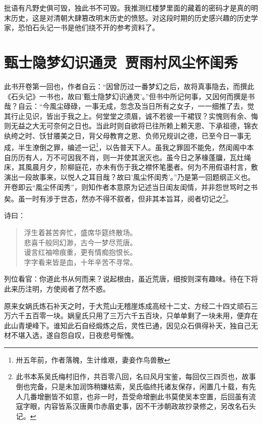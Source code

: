 \documentclass[12pt,oneside]{book}
\newenvironment{shici}{%
\begin{verse}%
\centering\large\hspace{12pt}}%
{\end{verse}}
\begin{document}
批语有凡野史俱可毁，独此书不可毁。我推测红楼梦里面的藏着的密码才是真的明末历史，这是对清朝大肆篡改明末历史的愤怒。对这段时期的历史感兴趣的历史学家，恐怕石头记一书是他们绕不开的参考资料了。



\setcounter{tocdepth}{2}    
\tableofcontents



\mainmatter


\chapter{甄士隐梦幻识通灵~贾雨村风尘怀闺秀}
此书开卷第一回也，作者自云：“因曾历过一番梦幻之后，故将真事隐去，而撰此《石头记》一书也，故曰’甄士隐梦幻识通灵’。”但书中所记何事，又因何而撰是书哉？自云：“今風尘碌碌，一事无成，忽念及当日所有之女子，一一细推了去，觉其行止见识，皆出于我之上。何堂堂之须眉，诚不若彼一干裙钗？实愧则有余、悔则无益之大无可奈何之日也。当此时则自欲将已往所赖上赖天恩、下承祖德，锦衣纨绔之时、饫甘餍美之日，背父母教育之恩、负师兄规训之德，已至今日一事无成，半生潦倒之罪，编述一记\footnote{卅五年前，作者落魄，生计维艰，妻妾作鸟兽散}，以告普天下人。虽我之罪固不能免，然闺阁中本自历历有人，万不可因我不肖，则一并使其泯灭也。虽今日之茅椽蓬牖，瓦灶绳床，其風晨月夕，阶柳庭花，亦未有伤于我之襟怀笔墨者。何为不用假语村言，敷演出一段故事来，以悦人之耳目哉？故曰’風尘怀闺秀’。”乃是第一回题纲正义也。开卷即云“風尘怀闺秀”，则知作者本意原为记述当日闺友闺情，并非怨世骂时之书矣。虽一时有涉于世态，然亦不得不叙者，但非其本旨耳，阅者切记之\footnote{此书本系吴氏梅村旧作，共百零八回，名曰风月宝鉴，每回仅三四页也，故事倒也完备，只是未加润饰稍嫌枯索，吴氏临终托诸友保存，闲置几十载，有先人几番增删皆不如意，也非一时，吾受命增删此书莫使吴本空置，后回虽有流寇字眼，内容皆系汉唐黄巾赤眉史事，因不干涉朝政故抄录修之，另改名石头记。}。

诗曰：

\begin{shici}
浮生着甚苦奔忙，盛席华筵终散场。\\
悲喜千般同幻渺，古今一梦尽荒唐。\\
谩言红袖啼痕重，更有情痴抱恨长。\\
字字看来皆是血，十年辛苦不寻常。
\end{shici}


列位看官：你道此书从何而来？说起根由，虽近荒唐，细按则深有趣味。待在下将此来历注明，方使阅者了然不惑。

原来女娲氏炼石补天之时，于大荒山无稽崖炼成高经十二丈、方经二十四丈顽石三万六千五百零一块。娲皇氏只用了三万六千五百块，只单单剩了一块未用，便弃在此山青埂峰下。谁知此石自经煅炼之后，灵性已通，因见众石俱得补天，独自己无材不堪入选，遂自怨自叹，日夜悲号惭愧。
\end{document}
